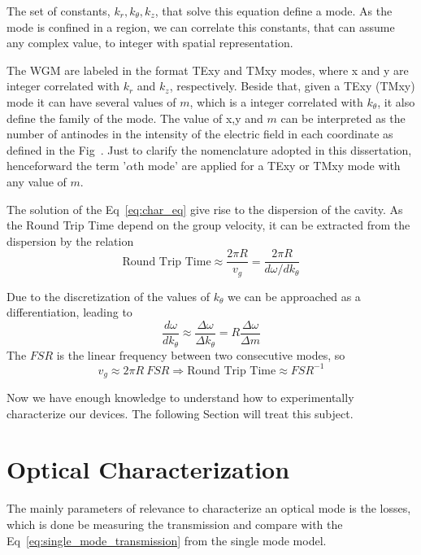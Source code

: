 The set of constants, $k_r,k_\theta,k_z$, that solve this equation define a mode. As the mode is confined in a region, we can correlate this constants, that can assume any complex value, to integer with spatial representation.

The WGM are labeled in the format TExy and TMxy modes, where x and y are integer correlated with $k_r$ and $k_z$, respectively. Beside that, given a TExy (TMxy) mode it can have several values of $m$, which is a integer correlated with $k_\theta$, it also define the family of the mode. The value of x,y and $m$ can be interpreted as the number of antinodes in the intensity of the electric field in each coordinate as defined in the Fig~. Just to clarify the nomenclature adopted in this dissertation, henceforward the term '$\alpha$th mode' are applied for a TExy or TMxy mode with any value of $m$. 

The solution of the Eq~\ref{eq:char_eq} give rise to the dispersion of the cavity. As the Round Trip Time depend on the group velocity, it can be extracted from the dispersion by the relation
\begin{equation}
    \text{Round Trip Time} \approx \frac{2\pi R}{v_g} = \frac{2\pi R}{d\omega/dk_\theta} 
\end{equation}

Due to the discretization of the values of $k_\theta$ we can be approached as a differentiation, leading to
\begin{equation}
    \frac{d\omega}{dk_\theta} \approx \frac{\Delta \omega}{\Delta k_\theta} = R\frac{\Delta \omega}{\Delta m}
\end{equation}
The $FSR$ is the linear frequency between two consecutive modes, so
\begin{equation}
    v_g \approx 2\pi R~FSR \Rightarrow \text{Round Trip Time} \approx FSR^{-1} 
\end{equation}

Now we have enough knowledge to understand how to experimentally characterize our devices. The following Section will treat this subject. 

\section{Optical Characterization}

The mainly parameters of relevance to characterize an optical mode is the losses, which is done be measuring the transmission and compare with the Eq~\ref{eq:single_mode_transmission} from the single mode model. 


